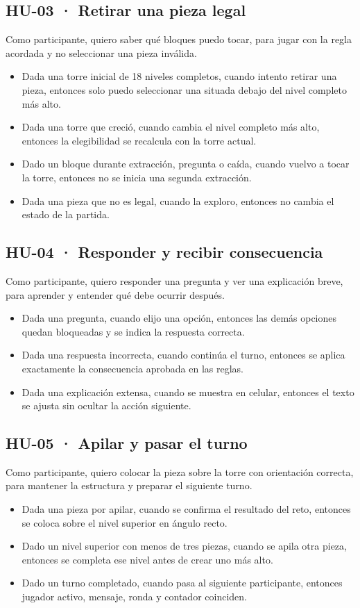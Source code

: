 \documentclass[11pt,letterpaper]{article}
\begin{document}
\subsection*{HU-03 · Retirar una pieza legal}
Como participante, quiero saber qué bloques puedo tocar, para jugar con la regla acordada y no seleccionar una pieza inválida.
\begin{itemize}
  \item Dada una torre inicial de 18 niveles completos, cuando intento retirar una pieza, entonces solo puedo seleccionar una situada debajo del nivel completo más alto.
  \item Dada una torre que creció, cuando cambia el nivel completo más alto, entonces la elegibilidad se recalcula con la torre actual.
  \item Dado un bloque durante extracción, pregunta o caída, cuando vuelvo a tocar la torre, entonces no se inicia una segunda extracción.
  \item Dada una pieza que no es legal, cuando la exploro, entonces no cambia el estado de la partida.
\end{itemize}

\subsection*{HU-04 · Responder y recibir consecuencia}
Como participante, quiero responder una pregunta y ver una explicación breve, para aprender y entender qué debe ocurrir después.
\begin{itemize}
  \item Dada una pregunta, cuando elijo una opción, entonces las demás opciones quedan bloqueadas y se indica la respuesta correcta.
  \item Dada una respuesta incorrecta, cuando continúa el turno, entonces se aplica exactamente la consecuencia aprobada en las reglas.
  \item Dada una explicación extensa, cuando se muestra en celular, entonces el texto se ajusta sin ocultar la acción siguiente.
\end{itemize}

\subsection*{HU-05 · Apilar y pasar el turno}
Como participante, quiero colocar la pieza sobre la torre con orientación correcta, para mantener la estructura y preparar el siguiente turno.
\begin{itemize}
  \item Dada una pieza por apilar, cuando se confirma el resultado del reto, entonces se coloca sobre el nivel superior en ángulo recto.
  \item Dado un nivel superior con menos de tres piezas, cuando se apila otra pieza, entonces se completa ese nivel antes de crear uno más alto.
  \item Dado un turno completado, cuando pasa al siguiente participante, entonces jugador activo, mensaje, ronda y contador coinciden.
\end{itemize}
\end{document}

